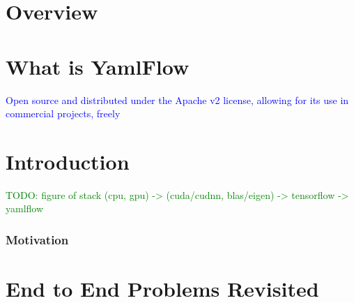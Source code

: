 \chapter{Overview}

\chapter{What is YamlFlow}

\textcolor{blue}{Open source and distributed under the Apache v2 license, allowing for its use in commercial projects, freely}

\chapter{Introduction}

\textcolor{green}{TODO: figure of stack (cpu, gpu) -> (cuda/cudnn, blas/eigen) -> tensorflow -> yamlflow}

\subsection{Motivation}

\chapter{End to End Problems Revisited}